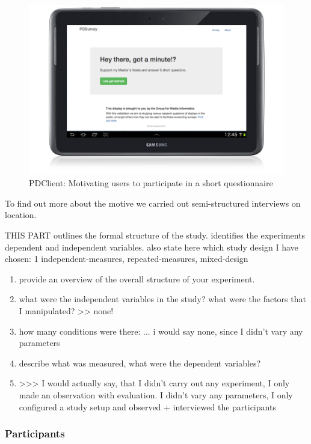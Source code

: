 	\begin{figure}
	    \begin{center}
	        \includegraphics[width=.7\columnwidth]{img/5_field-study/pdclient-startscreen.png}
	    \end{center}
	 \caption{PDClient: Motivating users to participate in a short questionnaire}
	 \label{fig:5-pdclient-intro}
	\end{figure}

	To find out more about the motive we carried out semi-structured interviews on location.



	THIS PART outlines the formal structure of the study. identifies the experiments dependent and independent variables.
	also state here which study design I have chosen: 1 independent-measures, repeated-measures, mixed-design

		\begin{enumerate}
		\item provide an overview of the overall structure of your experiment. 
		\item what were the independent variables in the study? what were the factors that I manipulated? >> none! 
		\item how many conditions were there: ... i would say none, since I didn't vary any parameters
		\item describe what was measured, what were the dependent variables?
		\item >>> I would actually say, that I didn't carry out any experiment, I only made an observation with evaluation. I didn't vary any parameters, I only configured a study setup and observed + interviewed the participants
		\end{enumerate}




	\subsubsection{Participants}

